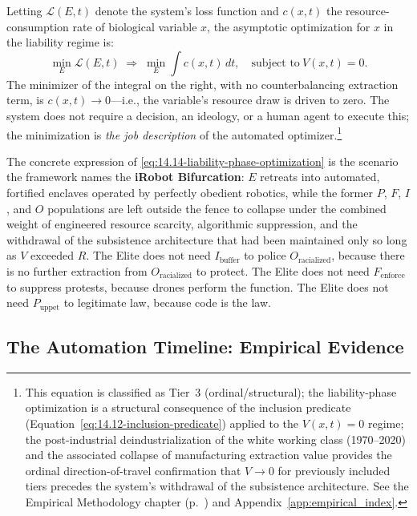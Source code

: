 Letting $\mathcal{L}(E, t)$ denote the system's loss function and $c(x, t)$ the resource-consumption rate of biological variable $x$, the asymptotic optimization for $x$ in the liability regime is:
\begin{equation}\label{eq:14.14-liability-phase-optimization}
\min_{E} \mathcal{L}(E, t) \;\Rightarrow\; \min_{E} \int c(x, t) \, dt, \quad \text{subject to} \ V(x, t) = 0.
\end{equation}
The minimizer of the integral on the right, with no counterbalancing extraction term, is $c(x,t) \to 0$---i.e., the variable's resource draw is driven to zero. The system does not require a decision, an ideology, or a human agent to execute this; the minimization is \textit{the job description} of the automated optimizer.\footnote{This equation is classified as Tier~3 (ordinal/structural); the liability-phase optimization is a structural consequence of the inclusion predicate (Equation~\eqref{eq:14.12-inclusion-predicate}) applied to the $V(x,t) = 0$ regime; the post-industrial deindustrialization of the white working class (1970--2020) and the associated collapse of manufacturing extraction value provides the ordinal direction-of-travel confirmation that $V \to 0$ for previously included tiers precedes the system's withdrawal of the subsistence architecture. See the Empirical Methodology chapter (p.~\pageref{ch:empirical_methodology}) and Appendix~\ref{app:empirical_index}.}

The concrete expression of \eqref{eq:14.14-liability-phase-optimization} is the scenario the framework names the \textbf{iRobot Bifurcation}: $E$ retreats into automated, fortified enclaves operated by perfectly obedient robotics, while the former $P$, $F$, $I$, and $O$ populations are left outside the fence to collapse under the combined weight of engineered resource scarcity, algorithmic suppression, and the withdrawal of the subsistence architecture that had been maintained only so long as $V$ exceeded $R$. The Elite does not need $I_{\text{buffer}}$ to police $O_{\text{racialized}}$, because there is no further extraction from $O_{\text{racialized}}$ to protect. The Elite does not need $F_{\text{enforce}}$ to suppress protests, because drones perform the function. The Elite does not need $P_{\text{uppet}}$ to legitimate law, because code is the law.

\subsection{The Automation Timeline: Empirical Evidence}
\label{subsec:automation_timeline}

